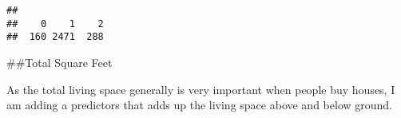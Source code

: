 \documentclass[]{article}
\newenvironment{Shaded}{\begin{snugshade}}{\end{snugshade}}
\newcommand{\DecValTok}[1]{\textcolor[rgb]{0.00,0.00,0.81}{#1}}
\newcommand{\KeywordTok}[1]{\textcolor[rgb]{0.13,0.29,0.53}{\textbf{#1}}}
\newcommand{\NormalTok}[1]{#1}
\newcommand{\OperatorTok}[1]{\textcolor[rgb]{0.81,0.36,0.00}{\textbf{#1}}}
\newcommand{\StringTok}[1]{\textcolor[rgb]{0.31,0.60,0.02}{#1}}
\begin{document}
\begin{Shaded}
\end{Shaded}

\begin{Shaded}
\end{Shaded}

\begin{verbatim}
## 
##    0    1    2 
##  160 2471  288
\end{verbatim}

\#\#Total Square Feet

As the total living space generally is very important when people buy
houses, I am adding a predictors that adds up the living space above and
below ground.

\begin{Shaded}
\end{Shaded}
\end{document}
